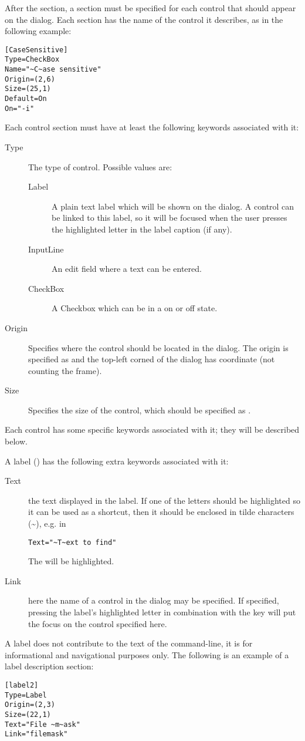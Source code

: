 After the  section, a section must be specified for each control that
should appear on the dialog. Each section has the name of the control it
describes, as in the following example:
\begin{verbatim}
[CaseSensitive]
Type=CheckBox
Name="~C~ase sensitive"
Origin=(2,6)
Size=(25,1)
Default=On
On="-i"
\end{verbatim}
Each control section  must have at least the following keywords associated
with it:
\begin{description}
\item[Type] The type of control. Possible values are:
\begin{description}
\item[Label] A plain text label which will be shown on the dialog.
A control can be linked to this label, so it will be focused when
the user presses the highlighted letter in the label caption (if any).
\item[InputLine] An edit field where a text can be entered.
\item[CheckBox] A Checkbox which can be in a on or off state.
\end{description}
\item[Origin] Specifies where the control should be located in the dialog.
The origin is specified as  and the top-left corned of
the dialog has coordinate  (not counting the frame).
\item[Size] Specifies the size of the control, which should be specified
as .
\end{description}

Each control has some specific keywords associated with it;
they will be described below.

A label () has the following extra keywords associated
with it:
\begin{description}
\item[Text] the text displayed in the label. If one of the letters should
be highlighted so it can be used as a shortcut, then it should be enclosed
in tilde characters (\~{}), e.g. in
\begin{verbatim}
Text="~T~ext to find"
\end{verbatim}
The  will be highlighted.
\item[Link] here the name of a control in the dialog may be specified.
If specified, pressing the label's highlighted letter in combination
with the  key will put the focus on the control specified here.
\end{description}
A label does not contribute to the text of the command-line, it is for
informational and navigational purposes only. The following is an
example of a label description section:
\begin{verbatim}
[label2]
Type=Label
Origin=(2,3)
Size=(22,1)
Text="File ~m~ask"
Link="filemask"
\end{verbatim}

